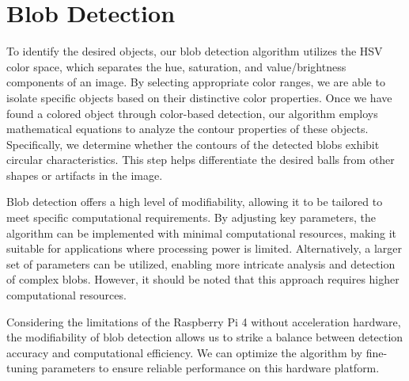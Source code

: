 \section{Blob Detection}

To identify the desired objects, our blob detection algorithm utilizes the HSV color space, which separates the hue, saturation, and value/brightness components of an image. By selecting appropriate color ranges, we are able to isolate specific objects based on their distinctive color properties. Once we have found a colored object through color-based detection, our algorithm employs mathematical equations to analyze the contour properties of these objects. Specifically, we determine whether the contours of the detected blobs exhibit circular characteristics. This step helps differentiate the desired balls from other shapes or artifacts in the image. 

Blob detection offers a high level of modifiability, allowing it to be tailored to meet specific computational requirements. By adjusting key parameters, the algorithm can be implemented with minimal computational resources, making it suitable for applications where processing power is limited. Alternatively, a larger set of parameters can be utilized, enabling more intricate analysis and detection of complex blobs. However, it should be noted that this approach requires higher computational resources. 

Considering the limitations of the Raspberry Pi 4 without acceleration hardware, the modifiability of blob detection allows us to strike a balance between detection accuracy and computational efficiency. We can optimize the algorithm by fine-tuning parameters to ensure reliable performance on this hardware platform. 







